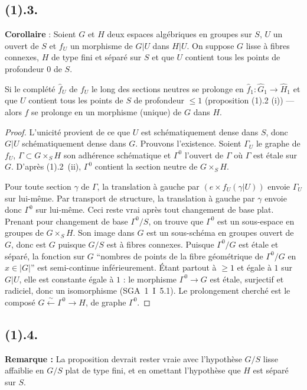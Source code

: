 \documentclass[12pt,a4paper]{article}
\theoremstyle{plain}
\theoremstyle{definition}
\theoremstyle{remark}
\begin{document}
\subsection*{\textbf{(1).3.}}
\textbf{Corollaire} : Soient $G$ et $H$ deux espaces algébriques en groupes sur $S$, $U$ un ouvert de $S$ et $f_U$ un morphisme de $G|U$ dans $H|U$. On suppose $G$ lisse à fibres connexes, $H$ de type fini et séparé sur $S$ et que $U$ contient tous les points de profondeur $0$ de $S$.

Si le complété $\hat{f}_U$ de $f_U$ le long des sections neutres se prolonge en $\hat{f}_1 : \hat{G}_1 \to \hat{H}_1$ et que $U$ contient tous les points de $S$ de profondeur $\leq 1$ (proposition (1).2 (i)) --- alors $f$ se prolonge en un morphisme (unique) de $G$ dans $H$.

\begin{proof}
L'unicité provient de ce que $U$ est schématiquement dense dans $S$, donc $G|U$ schématiquement dense dans $G$. Prouvons l'existence. Soient $\Gamma_U$ le graphe de $f_U$, $\Gamma \subset G \times_S H$ son adhérence schématique et $\Gamma^0$ l'ouvert de $\Gamma$ où $\Gamma$ est étale sur $G$. D'après (1).2~(ii), $\Gamma^0$ contient la section neutre de $G \times_S H$.

Pour toute section $\gamma$ de $\Gamma$, la translation à gauche par $(e \times f_U(\gamma|U))$ envoie $\Gamma_U$ sur lui-même. Par transport de structure, la translation à gauche par $\gamma$ envoie donc $\Gamma^0$ sur lui-même. Ceci reste vrai après tout changement de base plat. Prenant pour changement de base $\Gamma^0/S$, on trouve que $\Gamma^0$ est un sous-espace en groupes de $G \times_S H$. Son image dans $G$ est un sous-schéma en groupes ouvert de $G$, donc est $G$ puisque $G/S$ est à fibres connexes. Puisque $\Gamma^0/G$ est étale et séparé, la fonction sur $G$ ``nombres de points de la fibre géométrique de $\Gamma^0/G$ en $x \in |G|$'' est semi-continue inférieurement. Étant partout à $\geq 1$ et égale à $1$ sur $G|U$, elle est constante égale à $1$ : le morphisme $\Gamma^0 \to G$ est étale, surjectif et radiciel, donc un isomorphisme (SGA~1~I~5.1). Le prolongement cherché est le composé $G \xleftarrow{\sim} \Gamma^0 \longrightarrow H$, de graphe $\Gamma^0$.
\end{proof}

\subsection*{\textbf{(1).4.}}
\textbf{Remarque :} La proposition devrait rester vraie avec l'hypothèse $G/S$ lisse affaiblie en $G/S$ plat de type fini, et en omettant l'hypothèse que $H$ est séparé sur $S$.
\end{document}
